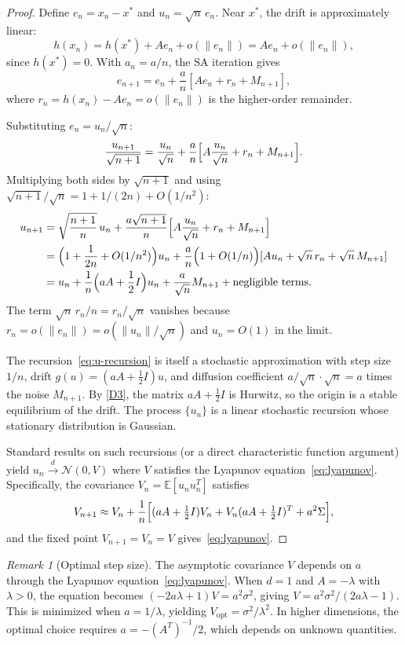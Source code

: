 \documentclass[11pt,a4paper]{article}
\theoremstyle{definition}
\theoremstyle{plain}
\theoremstyle{remark}
\newtheorem{remark}{Remark}[section]
\newcommand{\E}{\mathbb{E}}
\newcommand{\cdist}{\xrightarrow{d}}
\begin{document}
\begin{proof}
Define $e_n = x_n - x^*$ and $u_n = \sqrt{n}\, e_n$. Near $x^*$, the drift is
approximately linear:
\[
  h(x_n) = h(x^*) + A e_n + o(\|e_n\|) = A e_n + o(\|e_n\|),
\]
since $h(x^*) = 0$. With $a_n = a/n$, the SA iteration gives
\[
  e_{n+1} = e_n + \frac{a}{n}[A e_n + r_n + M_{n+1}],
\]
where $r_n = h(x_n) - A e_n = o(\|e_n\|)$ is the higher-order remainder.

Substituting $e_n = u_n / \sqrt{n}$:
\[
  \frac{u_{n+1}}{\sqrt{n+1}}
    = \frac{u_n}{\sqrt{n}} + \frac{a}{n}\Bigl[A \frac{u_n}{\sqrt{n}} + r_n + M_{n+1}\Bigr].
\]
Multiplying both sides by $\sqrt{n+1}$ and using $\sqrt{n+1}/\sqrt{n} = 1 + 1/(2n) + O(1/n^2)$:
\begin{align}
  u_{n+1} &= \sqrt{\frac{n+1}{n}} \, u_n + \frac{a\sqrt{n+1}}{n}
    \Bigl[A \frac{u_n}{\sqrt{n}} + r_n + M_{n+1}\Bigr] \notag \\
  &= \Bigl(1 + \frac{1}{2n} + O(1/n^2)\Bigr) u_n
    + \frac{a}{n}\Bigl(1 + O(1/n)\Bigr)[A u_n + \sqrt{n}\, r_n + \sqrt{n}\, M_{n+1}] \notag \\
  &= u_n + \frac{1}{n}\Bigl(aA + \frac{1}{2}I\Bigr) u_n
    + \frac{a}{\sqrt{n}} M_{n+1} + \text{negligible terms}. \label{eq:u-recursion}
\end{align}
The term $\sqrt{n}\, r_n / n = r_n / \sqrt{n}$ vanishes because $r_n = o(\|e_n\|) = o(\|u_n\|/\sqrt{n})$ and $u_n = O(1)$ in the limit.

The recursion~\eqref{eq:u-recursion} is itself a stochastic approximation with step
size $1/n$, drift $g(u) = (aA + \frac{1}{2}I)u$, and diffusion coefficient
$a/\sqrt{n} \cdot \sqrt{n} = a$ times the noise $M_{n+1}$. By \ref{D3}, the matrix
$aA + \frac{1}{2}I$ is Hurwitz, so the origin is a stable equilibrium of the drift.
The process $\{u_n\}$ is a linear stochastic recursion whose stationary distribution
is Gaussian.

Standard results on such recursions (or a direct characteristic function argument)
yield $u_n \cdist \mathcal{N}(0, V)$ where $V$ satisfies the Lyapunov
equation~\eqref{eq:lyapunov}. Specifically, the covariance $V_n = \E[u_n u_n^T]$
satisfies
\[
  V_{n+1} \approx V_n + \frac{1}{n}\Bigl[(aA + \tfrac{1}{2}I) V_n
    + V_n (aA + \tfrac{1}{2}I)^T + a^2 \Sigma\Bigr],
\]
and the fixed point $V_{n+1} = V_n = V$ gives~\eqref{eq:lyapunov}.
\end{proof}

\begin{remark}[Optimal step size]
\label{rem:optimal-step}
The asymptotic covariance $V$ depends on $a$ through the Lyapunov
equation~\eqref{eq:lyapunov}. When $d = 1$ and $A = -\lambda$ with $\lambda > 0$,
the equation becomes $(-2a\lambda + 1)V = a^2 \sigma^2$, giving
$V = a^2 \sigma^2 / (2a\lambda - 1)$. This is minimized when $a = 1/\lambda$,
yielding $V_{\mathrm{opt}} = \sigma^2 / \lambda^2$. In higher dimensions, the
optimal choice requires $a = -(A^T)^{-1}/2$, which depends on unknown quantities.
\end{remark}
\end{document}
